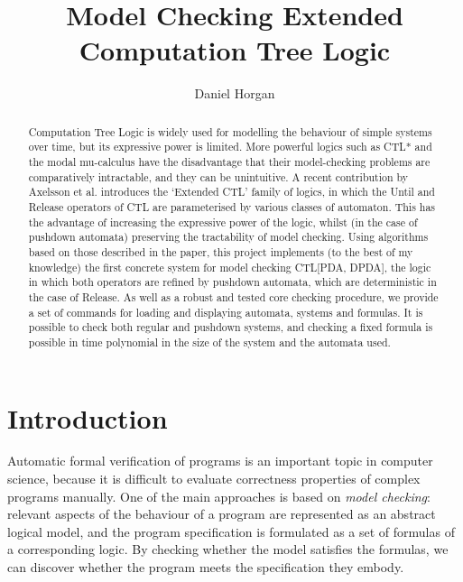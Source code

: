 \documentclass[11pt]{article}
\theoremstyle{definition}
\begin{document}
\title{Model Checking Extended Computation Tree Logic}
\author{Daniel Horgan}
\maketitle

\begin{abstract}

Computation Tree Logic is widely used for modelling the behaviour of simple
systems over time, but its expressive power is limited.  More powerful logics
such as CTL* and the modal mu-calculus have the disadvantage that their
model-checking problems are comparatively intractable, and they can be
unintuitive.  A recent contribution by Axelsson et al. introduces the `Extended
CTL' family of logics, in which the Until and Release operators of CTL are
parameterised by various classes of automaton. This has the advantage of
increasing the expressive power of the logic, whilst (in the case of pushdown
automata) preserving the tractability of model checking. 
Using algorithms based on those described in the paper, this project implements
(to the best of my knowledge) the first concrete system for model checking
CTL[PDA, DPDA], the logic in which both operators are refined by pushdown
automata, which are deterministic in the case of Release. 
As well as a robust and tested core checking procedure, we provide a set of
commands for loading and displaying automata, systems and formulas. It is
possible to check both regular and pushdown systems, and checking a fixed
formula is possible in time polynomial in the size of the system and the
automata used.


\end{abstract}

\newpage

\tableofcontents
\setcounter{tocdepth}{3}

\newpage

\section{Introduction}

Automatic formal verification of programs is an important topic in computer
science, because it is difficult to evaluate correctness properties of complex
programs manually. One of the main approaches is based on \textit{model
checking}: relevant aspects of the behaviour of a program are represented as an
abstract logical model, and the program specification is formulated as a set of
formulas of a corresponding logic. By checking whether the model satisfies the
formulas, we can discover whether the program meets the specification they
embody.
\end{document}
